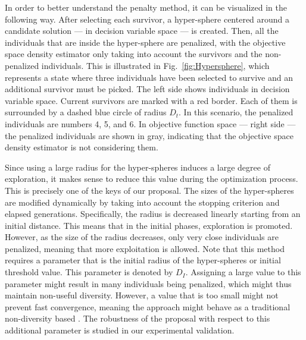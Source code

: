 In order to better understand the penalty method, it can be visualized in the following way.
%
After selecting each survivor, a hyper-sphere 
centered around a candidate solution --- in decision variable space --- is created.
%
Then, all the individuals that are inside the hyper-sphere are penalized, with the objective space density estimator only taking 
into account the survivors and the non-penalized individuals.
%
This is illustrated in Fig.~\ref{fig:Hypersphere}, which represents a state where three individuals have been 
selected to survive and an additional survivor must be picked.
%
The left side shows individuals in decision variable space.
%
Current survivors are marked with a red border. Each of them is surrounded by a dashed blue circle of 
radius $D_t$.
%
In this scenario, the penalized individuals are numbers 4, 5, and 6.
%
In objective function space --- right side --- the penalized individuals are shown in gray, indicating
that the objective space density estimator is not considering them.

Since using a large radius for the hyper-spheres induces a large degree of 
exploration, it makes sense to reduce this value during the optimization process.
%
This is precisely one of the keys of our proposal.
%
The sizes of the hyper-spheres are modified dynamically by taking into account the stopping 
criterion and elapsed generations.
%
Specifically, the radius is decreased linearly starting from an initial distance.
%
This means that in the initial phases, exploration is promoted.
%
However, as the size of the radius decreases, only very close individuals are penalized, meaning that more 
exploitation is allowed.
%
Note that this method requires a parameter that is the initial radius of the 
hyper-spheres or initial threshold value.
%
This parameter is denoted by $D_I$. 
%
Assigning a large value to this parameter might result in many individuals being penalized, which might thus maintain non-useful diversity.
%
However, a value that is too small might not prevent fast convergence, meaning the approach  
might behave as a traditional non-diversity based \MOEA{}.
%
The robustness of the proposal with respect to this additional parameter is studied in our experimental validation.


